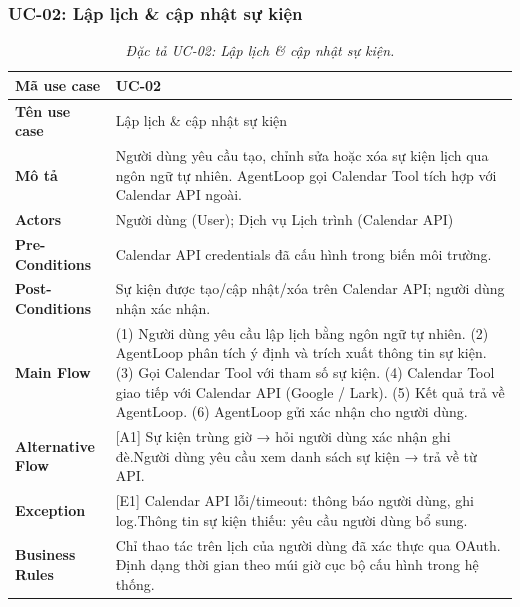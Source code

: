 \subsubsection{UC-02: Lập lịch \& cập nhật sự kiện}
\label{subsec:spec-uc02}
\renewcommand{\arraystretch}{1.4}
\begin{longtable}{|>{\bfseries}p{3.5cm}|p{10.5cm}|}
  \caption{\emph{Đặc tả UC-02: Lập lịch \& cập nhật sự kiện.}} \label{tab:spec-uc02} \\
  \hline
  Mã use case      & UC-02 \\ \hline
  Tên use case     & Lập lịch \& cập nhật sự kiện \\ \hline
  Mô tả            & Người dùng yêu cầu tạo, chỉnh sửa hoặc xóa sự kiện lịch qua ngôn ngữ tự nhiên. AgentLoop gọi Calendar Tool tích hợp với Calendar API ngoài. \\ \hline
  Actors           & Người dùng (User); Dịch vụ Lịch trình (Calendar API) \\ \hline
  Pre-Conditions   & Calendar API credentials đã cấu hình trong biến môi trường. \\ \hline
  Post-Conditions  & Sự kiện được tạo/cập nhật/xóa trên Calendar API; người dùng nhận xác nhận. \\ \hline
  Main Flow        & (1) Người dùng yêu cầu lập lịch bằng ngôn ngữ tự nhiên.\newline
                     (2) AgentLoop phân tích ý định và trích xuất thông tin sự kiện.\newline
                     (3) Gọi Calendar Tool với tham số sự kiện.\newline
                     (4) Calendar Tool giao tiếp với Calendar API (Google / Lark).\newline
                     (5) Kết quả trả về AgentLoop.\newline
                     (6) AgentLoop gửi xác nhận cho người dùng. \\ \hline
  Alternative Flow & [A1] Sự kiện trùng giờ → hỏi người dùng xác nhận ghi đè.\newline
                     [A2] Người dùng yêu cầu xem danh sách sự kiện → trả về từ API. \\ \hline
  Exception        & [E1] Calendar API lỗi/timeout: thông báo người dùng, ghi log.\newline
                     [E2] Thông tin sự kiện thiếu: yêu cầu người dùng bổ sung. \\ \hline
  Business Rules   & Chỉ thao tác trên lịch của người dùng đã xác thực qua OAuth.\newline
                     Định dạng thời gian theo múi giờ cục bộ cấu hình trong hệ thống. \\ \hline
\end{longtable}

